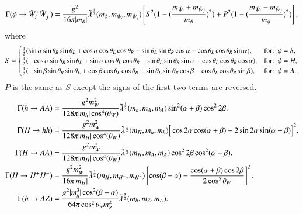 \documentclass[final,3p,times]{elsarticle}
\begin{document}
\begin{equation}\label{phichchdif}
\Gamma (\phi \rightarrow \tilde{W}_i^+ \tilde{W}_j^-) = {g^2 \over 16\pi |m_\phi|} \tilde{\lambda}^{1 \over 2} (m_\phi,m_{\tilde{W}_i}, m_{\tilde{W}_j}) \left[S^2 (1 - ({m_{\tilde{W}_i} + m_{\tilde{W}_j} \over m_\phi})^2) + P^2 (1 - ({m_{\tilde{W}_i} - m_{\tilde{W}_j} \over m_\phi})^2) \right],
\end{equation} 
where
\begin{equation}
S = \begin{cases}
  	{1 \over 2} (\sin \alpha \sin \theta_R \sin \theta_L + \cos \alpha \cos \theta_L \cos \theta_R - \sin \theta_L \sin \theta_R \cos \alpha - \cos \theta_L \cos \theta_R \sin \alpha), & $for$ :\ \phi = h, \\
  	{1 \over 2} (-\cos \alpha \sin \theta_R \sin \theta_L + \sin \alpha \cos \theta_L \cos \theta_R - \sin \theta_L \sin \theta_R \sin \alpha + \cos \theta_L \cos \theta_R \cos \alpha), & $for$ :\ \phi = H, \\
  	{1 \over 2} (-\sin \beta \sin \theta_R \sin \theta_L + \cos \beta \cos \theta_L \cos \theta_R + \sin \theta_L \sin \theta_R \cos \beta - \cos \theta_L \cos \theta_R \sin \beta), & $for$ :\ \phi = A. \\
    \end{cases}
\end{equation}
$P$ is the same as $S$ except the signs of the first two terms are reversed.
\begin{align}
\Gamma (h \rightarrow A A) &= {g^2 m_W^2\over 128\pi |m_h| \cos^4(\theta_W)} \tilde{\lambda}^{1 \over 2} (m_h,m_A, m_A) \sin^2 (\alpha + \beta) \cos^2 2\beta. \label{htoAA} \\  
\Gamma (H \rightarrow h h) &= {g^2 m_W^2 \over 128\pi |m_H| \cos^4(\theta_W)} \tilde{\lambda}^{1 \over 2} (m_H,m_h, m_h) \Big[\cos 2\alpha \cos(\alpha + \beta) - 2 \sin 2\alpha \sin(\alpha+\beta)\Big]^2. \label{Htohh} \\  
\Gamma (H \rightarrow A A) &= {g^2 m_W^2 \over 128\pi |m_H| \cos^4(\theta_W)} \tilde{\lambda}^{1 \over 2} (m_H,m_A, m_A) \cos^2 2\beta \cos^2(\alpha + \beta). \label{HtoAA} \\ 
\Gamma (H \rightarrow H^+ H^-) &= {g^2 m_W^2 \over 16\pi |m_H|} \tilde{\lambda}^{1 \over 2} (m_H,m_{H^+}, m_{H^-}) \left[\cos (\beta -\alpha) - {\cos(\alpha + \beta) \cos 2\beta \over 2\cos^2 \theta_W}\right]^2. \label{HHpmHpm}  \\ 
\Gamma (h \rightarrow A Z) &= {g^2 |m_h^3| \cos^2 (\beta -\alpha) \over 64\pi \cos^2 \theta_w m_{Z}^2} \tilde{\lambda}^{3 \over 2} (m_h,m_Z, m_A). \label{htoAZ}
\end{align} 
\end{document}
